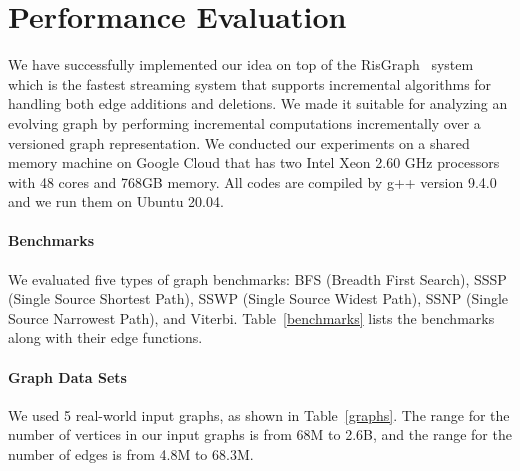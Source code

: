 \section{Performance Evaluation}
\label{Evaluation}
We have successfully implemented our idea on top of the RisGraph~\cite{risgraph} system which is the fastest streaming system that supports incremental algorithms for handling both edge additions and deletions. We made it suitable for analyzing an evolving graph by performing incremental computations incrementally over a versioned graph representation. We conducted our experiments on a shared memory machine on Google Cloud that has two Intel Xeon 2.60 GHz processors with 48 cores and 768GB memory. All codes are compiled by g++ version 9.4.0 and we run them on Ubuntu 20.04. 

\paragraph*{Benchmarks} We evaluated five types of graph benchmarks: BFS (Breadth First Search), SSSP (Single Source Shortest Path), SSWP (Single Source Widest Path), SSNP (Single Source Narrowest Path), and Viterbi. Table~\ref{benchmarks} lists the benchmarks along with their edge functions.

\paragraph*{Graph Data Sets} We used 5 real-world input graphs, as shown in Table~\ref{graphs}. The range for the number of vertices in our input graphs is from 68M to 2.6B, and the range for the number of edges is from 4.8M to 68.3M.






